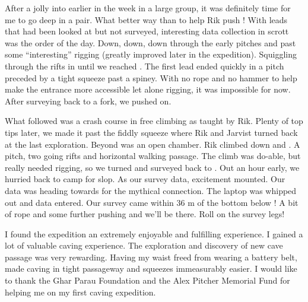 After a jolly into  earlier in the week in a large group,
it was definitely time for me to go deep in a pair. What better way than
to help Rik push ! With leads that had been looked at
but not surveyed, interesting data collection in scrott was the order of
the day. Down, down, down through the early  pitches and
past some ``interesting'' rigging (greatly improved later in the
expedition). Squiggling through the rifts in  until we reached
. The first lead ended quickly in a pitch preceded by a
tight squeeze past a spiney. With no rope and no hammer to help make the
entrance more accessible let alone rigging, it was impossible for now.
After surveying back to a fork, we pushed on.

What followed was a crash course in free climbing as taught by Rik.
Plenty of top tips later, we made it past the fiddly squeeze where Rik
and Jarvist turned back at the last exploration. Beyond was an open
chamber. Rik climbed down and . A pitch, two going rifts and horizontal walking
passage. The climb was do-able, but really needed rigging, so we turned
and surveyed back to . Out an hour early, we hurried
back to camp for slop. As our survey data, excitement mounted. Our data
was heading towards  for the mythical connection. The
laptop was whipped out and data entered. Our survey came within 36 m of
the bottom  below ! A bit of rope and some further pushing
and we'll be there. Roll on the survey legs!

I found the expedition an extremely enjoyable and fulfilling experience.
I gained a lot of valuable caving experience. The exploration and
discovery of new cave passage was very rewarding. Having my waist freed
from wearing a battery belt, made caving in tight passageway and
squeezes immeasurably easier. I would like to thank the Ghar Parau
Foundation and the Alex Pitcher Memorial Fund for helping me on my first
caving expedition.


